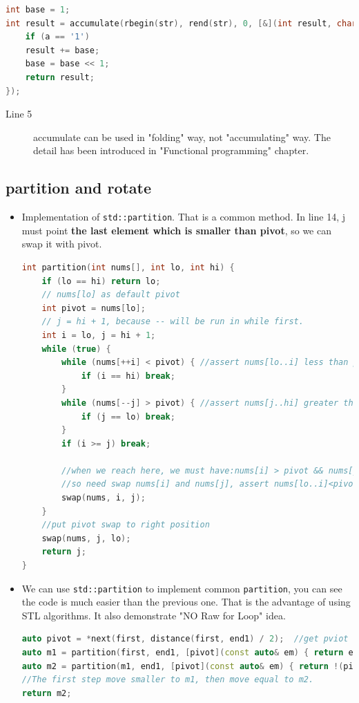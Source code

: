 \documentclass[a4paper,11pt,twoside]{book}
\begin{document}
\begin{itemize}
\begin{lstlisting}[frame=single, language=c++]
int base = 1;
int result = accumulate(rbegin(str), rend(str), 0, [&](int result, char a) {
	if (a == '1')
	result += base;
	base = base << 1;
	return result;
});	
\end{lstlisting}	
\begin{description}
	\item[Line 5] accumulate can be used in "folding" way, not "accumulating" way. The detail has been introduced in "Functional programming" chapter. 
\end{description}	
	
\end{itemize}

\subsection{partition and rotate}
\begin{itemize}
		\item Implementation of \texttt{std::partition}. That is a common method.  In line 14, j must point \textbf{the last element which is smaller than pivot}, so we can swap it with pivot. 
\begin{lstlisting}[frame=single, language=c++]	
int partition(int nums[], int lo, int hi) {
	if (lo == hi) return lo;
	// nums[lo] as default pivot
	int pivot = nums[lo];
	// j = hi + 1, because -- will be run in while first.
	int i = lo, j = hi + 1;
	while (true) {
		while (nums[++i] < pivot) { //assert nums[lo..i] less than pivot
			if (i == hi) break;
		}
		while (nums[--j] > pivot) { //assert nums[j..hi] greater than pivot.
			if (j == lo) break;
		}
		if (i >= j) break;

		//when we reach here, we must have:nums[i] > pivot && nums[j] < pivot
		//so need swap nums[i] and nums[j], assert nums[lo..i]<pivot< nums[j..hi]
		swap(nums, i, j);
	}
	//put pivot swap to right position
	swap(nums, j, lo);
	return j;
}
\end{lstlisting}

		\item We can use \texttt{std::partition} to implement common \texttt{partition}, you can see the code is much easier than the previous one. That is the advantage of using STL algorithms. It also demonstrate "NO Raw for Loop" idea. 
\begin{lstlisting}[frame=single, language=c++]	
auto pivot = *next(first, distance(first, end1) / 2);  //get pviot value
auto m1 = partition(first, end1, [pivot](const auto& em) { return em < pivot; });
auto m2 = partition(m1, end1, [pivot](const auto& em) { return !(pivot < em); });	
//The first step move smaller to m1, then move equal to m2. 
return m2;
\end{lstlisting}


\end{itemize}
\end{document}
